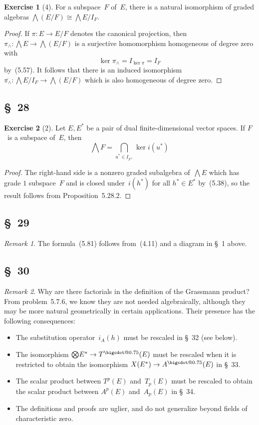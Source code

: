 \documentclass[letterpaper,12pt]{article}
\makeatletter
\newcommand{\iso}{\cong}
\newcommand{\bigcdot}[1]{\mathbin{\mathpalette\bigcdot@{#1}}}
\newcommand{\bigcdot@}[2]{%
  \sbox0{$#1\vcenter{}$}%
  \sbox2{$#1\cdot\m@th$}%
  \hbox{%
    \hfil
    \raise\ht0\hbox{%
      \scalebox{#2}{%
        \lower\ht0\hbox{$#1\bullet\m@th$}%
      }%
    }%
    \hfil
  }%
}
\newcommand{\bigsect}{\bigcap}
\newcommand{\bigtprod}{\bigotimes}
\newcommand{\medtprod}{{\textstyle\bigtprod}}
\newcommand{\eprod}{\wedge}
\newcommand{\bigeprod}{\bigwedge}
\newcommand{\medeprod}{{\textstyle\bigeprod}}
\newcommand{\tdot}{\bigcdot{0.75}}
\newcommand{\oc}[1]{#1^{\perp}}
\newcommand{\proj}[1]{\overline{#1}}
\theoremstyle{definition}
\newtheorem*{exer}{Exercise}
\theoremstyle{remark}
\newtheorem*{rmk}{Remark}
\makeatother
\begin{document}
\begin{exer}[4]
For a subspace~\(F\) of~\(E\), there is a natural isomorphism of graded algebras \(\medeprod(E/F)\iso\medeprod E/I_F\).
\end{exer}
\begin{proof}
If \(\pi:E\to E/F\) denotes the canonical projection, then \(\pi_{\eprod}:\medeprod E\to\medeprod(E/F)\) is a surjective homomorphism homogeneous of degree zero with
\[\ker\pi_{\eprod}=I_{\ker\pi}=I_F\]
by~(5.57). It follows that there is an induced isomorphism \(\proj{\pi_{\eprod}}:\medeprod E/I_F\to\medeprod(E/F)\) which is also homogeneous of degree zero.
\end{proof}

\subsection*{\S~28}
\begin{exer}[2]
Let \(E,E^*\) be a pair of dual finite-dimensional vector spaces. If \(F\)~is a subspace of~\(E\), then
\[\medeprod F=\bigsect_{u^*\in I_{\oc{F}}}\ker i(u^*)\]
\end{exer}
\begin{proof}
The right-hand side is a nonzero graded subalgebra of~\(\medeprod E\) which has grade \(1\) subspace~\(F\) and is closed under~\(i(h^*)\) for all \(h^*\in E^*\) by~(5.38), so the result follows from Proposition~5.28.2.
\end{proof}

\subsection*{\S~29}
\begin{rmk} The formula~(5.81) follows from~(4.11) and a diagram in \S~1 above.
\end{rmk}

\subsection*{\S~30}
\begin{rmk}
Why are there factorials in the definition of the Grassmann product? From problem~5.7.6, we know they are not needed algebraically, although they may be more natural geometrically in certain applications. Their presence has the following consequences:
\begin{itemize}
\item The substitution operator~\(i_A(h)\) must be rescaled in \S~32 (see below).
\item The isomorphism \(\medtprod E^*\to T^{\tdot}(E)\) must be rescaled when it is restricted to obtain the isomorphism \(X(E^*)\to A^{\tdot}(E)\) in \S~33.
\item The scalar product between \(T^p(E)\) and~\(T_p(E)\) must be rescaled to obtain the scalar product between \(A^p(E)\) and~\(A_p(E)\) in \S~34.
\item The definitions and proofs are uglier, and do not generalize beyond fields of characteristic zero.
\end{itemize}
\end{rmk}
\end{document}
